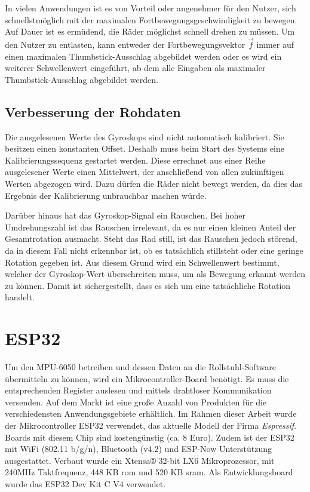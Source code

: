 In vielen Anwendungen ist es von Vorteil oder angenehmer für den Nutzer, sich schnellstmöglich mit der maximalen Fortbewegungsgeschwindigkeit zu bewegen.
Auf Dauer ist es ermüdend, die Räder möglichst schnell drehen zu müssen.
Um den Nutzer zu entlasten, kann entweder der Fortbewegungsvektor $\vec{f}$ immer auf einen maximalen Thumbstick-Ausschlag abgebildet werden oder es wird ein weiterer Schwellenwert eingeführt, ab dem alle Eingaben als maximaler Thumbstick-Ausschlag abgebildet werden.

\subsection{Verbesserung der Rohdaten}
Die ausgelesenen Werte des Gyroskops sind nicht automatisch kalibriert.
Sie besitzen einen konstanten Offset. Deshalb muss beim Start des Systems eine Kalibrierungssequenz gestartet werden.
Diese errechnet aus einer Reihe ausgelesener Werte einen Mittelwert, der anschließend von allen zukünftigen Werten abgezogen wird.
Dazu dürfen die Räder nicht bewegt werden, da dies das Ergebnis der Kalibrierung unbrauchbar machen würde.

Darüber hinaus hat das Gyroskop-Signal ein Rauschen.
Bei hoher Umdrehungszahl ist das Rauschen irrelevant, da es nur einen kleinen Anteil der Gesamtrotation ausmacht.
Steht das Rad still, ist das Rauschen jedoch störend, da in diesem Fall nicht erkennbar ist, ob es tatsächlich stillsteht oder eine geringe Rotation gegeben ist.
Aus diesem Grund wird ein Schwellenwert bestimmt, welcher der Gyroskop-Wert überschreiten muss, um als Bewegung erkannt werden zu können.
Damit ist sichergestellt, dass es sich um eine tatsächliche Rotation handelt.

\section{ESP32}
Um den MPU-6050 betreiben und dessen Daten an die Rollstuhl-Software übermitteln zu können, wird ein Mikrocontroller-Board benötigt.
Es muss die entsprechenden Register auslesen und mittels drahtloser Kommunikation versenden.
Auf dem Markt ist eine große Anzahl von Produkten für die verschiedensten Anwendungsgebiete erhältlich.
Im Rahmen dieser Arbeit wurde der Mikrocontroller ESP32 verwendet, das aktuelle Modell der Firma \textit{Espressif}.
Boards mit diesem Chip sind kostengünstig (ca. 8 Euro).
Zudem ist der ESP32 mit WiFi (802.11 b/g/n), Bluetooth (v4.2) und ESP-Now Unterstützung ausgestattet\cite{ESP32Datasheet2022}.
Verbaut wurde ein Xtensa® 32-bit LX6 Mikroprozessor, mit 240MHz Taktfrequenz, 448 KB \ac{rom} und 520 KB \ac{sram}\cite{ESP32Datasheet2022}.
Als Entwicklungsboard wurde das ESP32 Dev Kit C V4 verwendet.

